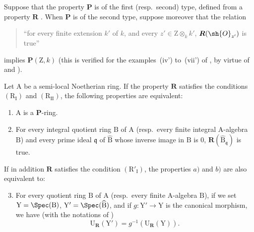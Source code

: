 \begin{proposition}[7.3.16]
\label{IV.7.3.16}
Suppose that the property $\boldsymbol{P}$ is of the first (resp.~second) type, defined from a property $\boldsymbol{R}$ .
When $\boldsymbol{P}$ is of the second type, suppose moreover that the relation
\begin{quote}
``for every finite extension $k'$ of $k$, and every $z'\in\mathrm{Z}\otimes_k k'$, $\boldsymbol{R}(\sh{O}_{z'})$ is true''
\end{quote}
implies $\boldsymbol{P}(\mathrm{Z},k)$ (this is verified for the examples~(iv') to~(vii') of , by virtue of  and ).

Let $\mathrm{A}$ be a semi-local Noetherian ring.
If the property $\boldsymbol{R}$ satisfies the conditions $(\mathrm{R_I})$ and $(\mathrm{R_{II}})$, the following properties are equivalent:
\begin{enumerate}[label=\emph{\alph*)}]
  \item $\mathrm{A}$ is a $\boldsymbol{P}$-ring.
  \item For every integral quotient ring $\mathrm{B}$ of $\mathrm{A}$ (resp.~every finite integral A-algebra $\mathrm{B}$) and every prime ideal $\mathfrak{q}$ of $\widehat{\mathrm{B}}$ whose inverse image in $\mathrm{B}$ is $0$, $\boldsymbol{R}(\widehat{\mathrm{B}}_\mathfrak{q})$ is true.
\end{enumerate}
If in addition $\boldsymbol{R}$ satisfies the condition $(\mathrm{R}'_\mathrm{I})$, the properties $a)$ and $b)$ are also equivalent to:
\begin{enumerate}[label=\emph{\alph*)}]
  \setcounter{enumi}{2}
  \item For every quotient ring $\mathrm{B}$ of $\mathrm{A}$ (resp.~every finite A-algebra $\mathrm{B}$), if we set $\mathrm{Y}=\Spec(\mathrm{B})$, $\mathrm{Y}'=\Spec(\widehat{\mathrm{B}})$, and if $g:\mathrm{Y}'\to\mathrm{Y}$ is the canonical morphism, we have (with the notations of )
  \[
    \mathrm{U}_{\boldsymbol{R}}(\mathrm{Y}')=g^{-1}(\mathrm{U}_{\boldsymbol{R}}(\mathrm{Y})).
    \tag{7.3.16.1}
  \]
\end{enumerate}
\end{proposition}

